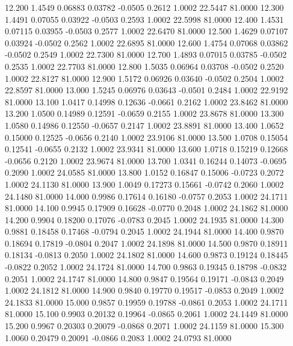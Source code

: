   12.200   1.4549   0.06883   0.03782  -0.0505   0.2612   1.0002  22.5447  81.0000
  12.300   1.4491   0.07055   0.03922  -0.0503   0.2593   1.0002  22.5998  81.0000
  12.400   1.4531   0.07115   0.03955  -0.0503   0.2577   1.0002  22.6470  81.0000
  12.500   1.4629   0.07107   0.03924  -0.0502   0.2562   1.0002  22.6895  81.0000
  12.600   1.4754   0.07068   0.03862  -0.0502   0.2549   1.0002  22.7300  81.0000
  12.700   1.4893   0.07015   0.03785  -0.0502   0.2535   1.0002  22.7703  81.0000
  12.800   1.5035   0.06964   0.03708  -0.0502   0.2520   1.0002  22.8127  81.0000
  12.900   1.5172   0.06926   0.03640  -0.0502   0.2504   1.0002  22.8597  81.0000
  13.000   1.5245   0.06976   0.03643  -0.0501   0.2484   1.0002  22.9192  81.0000
  13.100   1.0417   0.14998   0.12636  -0.0661   0.2162   1.0002  23.8462  81.0000
  13.200   1.0500   0.14989   0.12591  -0.0659   0.2155   1.0002  23.8678  81.0000
  13.300   1.0580   0.14986   0.12550  -0.0657   0.2147   1.0002  23.8891  81.0000
  13.400   1.0652   0.15000   0.12525  -0.0656   0.2140   1.0002  23.9106  81.0000
  13.500   1.0708   0.15054   0.12541  -0.0655   0.2132   1.0002  23.9341  81.0000
  13.600   1.0718   0.15219   0.12668  -0.0656   0.2120   1.0002  23.9674  81.0000
  13.700   1.0341   0.16244   0.14073  -0.0695   0.2090   1.0002  24.0585  81.0000
  13.800   1.0152   0.16847   0.15006  -0.0723   0.2072   1.0002  24.1130  81.0000
  13.900   1.0049   0.17273   0.15661  -0.0742   0.2060   1.0002  24.1480  81.0000
  14.000   0.9986   0.17614   0.16180  -0.0757   0.2053   1.0002  24.1711  81.0000
  14.100   0.9945   0.17909   0.16628  -0.0770   0.2048   1.0002  24.1862  81.0000
  14.200   0.9904   0.18200   0.17076  -0.0783   0.2045   1.0002  24.1935  81.0000
  14.300   0.9881   0.18458   0.17468  -0.0794   0.2045   1.0002  24.1944  81.0000
  14.400   0.9870   0.18694   0.17819  -0.0804   0.2047   1.0002  24.1898  81.0000
  14.500   0.9870   0.18911   0.18134  -0.0813   0.2050   1.0002  24.1802  81.0000
  14.600   0.9873   0.19124   0.18445  -0.0822   0.2052   1.0002  24.1724  81.0000
  14.700   0.9863   0.19345   0.18798  -0.0832   0.2051   1.0002  24.1747  81.0000
  14.800   0.9847   0.19564   0.19171  -0.0843   0.2049   1.0002  24.1812  81.0000
  14.900   0.9840   0.19770   0.19517  -0.0853   0.2049   1.0002  24.1833  81.0000
  15.000   0.9857   0.19959   0.19788  -0.0861   0.2053   1.0002  24.1711  81.0000
  15.100   0.9903   0.20132   0.19964  -0.0865   0.2061   1.0002  24.1449  81.0000
  15.200   0.9967   0.20303   0.20079  -0.0868   0.2071   1.0002  24.1159  81.0000
  15.300   1.0060   0.20479   0.20091  -0.0866   0.2083   1.0002  24.0793  81.0000
